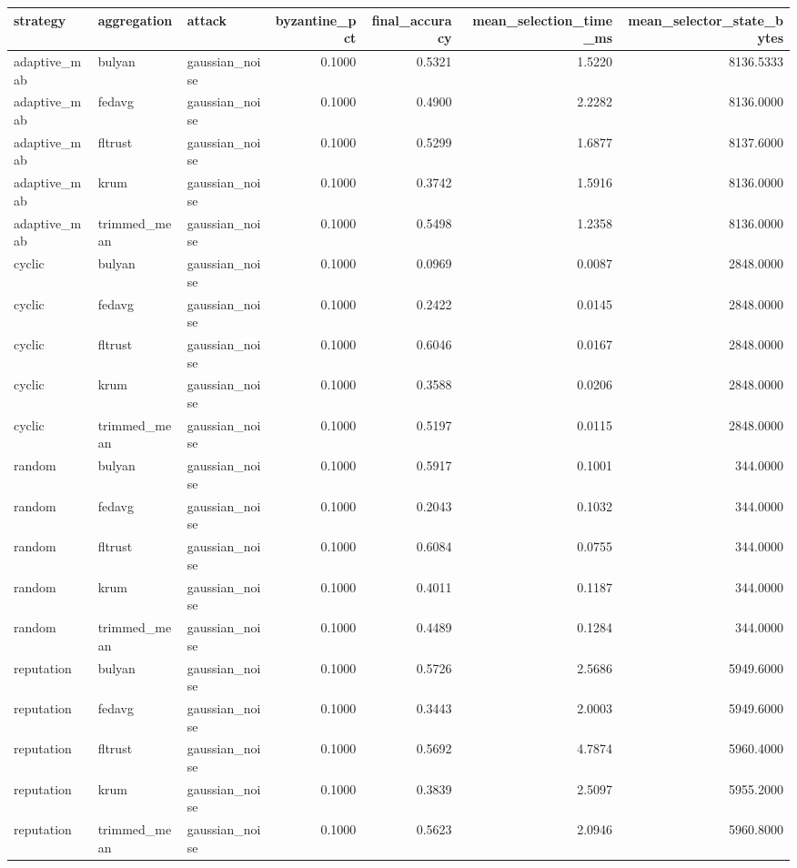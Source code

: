 \begin{tabular}{lllrrrr}
\toprule
strategy & aggregation & attack & byzantine\_pct & final\_accuracy & mean\_selection\_time\_ms & mean\_selector\_state\_bytes \\
\midrule
adaptive_mab & bulyan & gaussian_noise & 0.1000 & 0.5321 & 1.5220 & 8136.5333 \\
adaptive_mab & fedavg & gaussian_noise & 0.1000 & 0.4900 & 2.2282 & 8136.0000 \\
adaptive_mab & fltrust & gaussian_noise & 0.1000 & 0.5299 & 1.6877 & 8137.6000 \\
adaptive_mab & krum & gaussian_noise & 0.1000 & 0.3742 & 1.5916 & 8136.0000 \\
adaptive_mab & trimmed_mean & gaussian_noise & 0.1000 & 0.5498 & 1.2358 & 8136.0000 \\
cyclic & bulyan & gaussian_noise & 0.1000 & 0.0969 & 0.0087 & 2848.0000 \\
cyclic & fedavg & gaussian_noise & 0.1000 & 0.2422 & 0.0145 & 2848.0000 \\
cyclic & fltrust & gaussian_noise & 0.1000 & 0.6046 & 0.0167 & 2848.0000 \\
cyclic & krum & gaussian_noise & 0.1000 & 0.3588 & 0.0206 & 2848.0000 \\
cyclic & trimmed_mean & gaussian_noise & 0.1000 & 0.5197 & 0.0115 & 2848.0000 \\
random & bulyan & gaussian_noise & 0.1000 & 0.5917 & 0.1001 & 344.0000 \\
random & fedavg & gaussian_noise & 0.1000 & 0.2043 & 0.1032 & 344.0000 \\
random & fltrust & gaussian_noise & 0.1000 & 0.6084 & 0.0755 & 344.0000 \\
random & krum & gaussian_noise & 0.1000 & 0.4011 & 0.1187 & 344.0000 \\
random & trimmed_mean & gaussian_noise & 0.1000 & 0.4489 & 0.1284 & 344.0000 \\
reputation & bulyan & gaussian_noise & 0.1000 & 0.5726 & 2.5686 & 5949.6000 \\
reputation & fedavg & gaussian_noise & 0.1000 & 0.3443 & 2.0003 & 5949.6000 \\
reputation & fltrust & gaussian_noise & 0.1000 & 0.5692 & 4.7874 & 5960.4000 \\
reputation & krum & gaussian_noise & 0.1000 & 0.3839 & 2.5097 & 5955.2000 \\
reputation & trimmed_mean & gaussian_noise & 0.1000 & 0.5623 & 2.0946 & 5960.8000 \\

\end{tabular}

